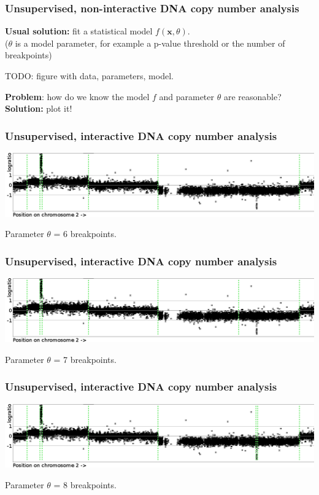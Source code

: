 \documentclass{beamer}
\begin{document}
\begin{frame}
  \frametitle{Unsupervised, non-interactive DNA copy number analysis}

  \textbf{Usual solution:} fit a statistical model $f(\mathbf x, \theta)$.\\
  ($\theta$ is a model parameter, for example a p-value threshold or
  the number of breakpoints)

  TODO: figure with data, parameters, model.

  \textbf{Problem}: how do we know the model $f$ and parameter
  $\theta$ are reasonable? \textbf{Solution:} plot it!
\end{frame}

\begin{frame}
  \frametitle{Unsupervised, interactive DNA copy number analysis}
  \includegraphics[width=\textwidth]{unlabeled-breakpoints-6}

  Parameter $\theta$ = 6 breakpoints.
\end{frame}

\begin{frame}
  \frametitle{Unsupervised, interactive DNA copy number analysis}
  \includegraphics[width=\textwidth]{unlabeled-breakpoints-7}

  Parameter $\theta$ = 7 breakpoints.
\end{frame}

\begin{frame}
  \frametitle{Unsupervised, interactive DNA copy number analysis}
  \includegraphics[width=\textwidth]{unlabeled-breakpoints-8}

  Parameter $\theta$ = 8 breakpoints.
\end{frame}
\end{document}
